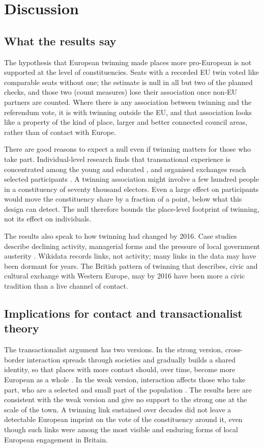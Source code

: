 \documentclass[11pt,a4paper]{article}
\begin{document}
\section{Discussion}\label{sec:disc}
\subsection{What the results say}
The hypothesis that European twinning made places more pro-European is not supported at the level of constituencies. Seats with a recorded EU twin voted like comparable seats without one; the estimate is null in all but two of the planned checks, and those two (count measures) lose their association once non-EU partners are counted. Where there is any association between twinning and the referendum vote, it is with twinning outside the EU, and that association looks like a property of the kind of place, larger and better connected council areas, rather than of contact with Europe.

There are good reasons to expect a null even if twinning matters for those who take part. Individual-level research finds that transnational experience is concentrated among the young and educated \citep{kuhn2015,fligstein2008}, and organised exchanges reach selected participants \citep{sigalas2010,mitchell2015}. A twinning association might involve a few hundred people in a constituency of seventy thousand electors. Even a large effect on participants would move the constituency share by a fraction of a point, below what this design can detect. The null therefore bounds the place-level footprint of twinning, not its effect on individuals.

The results also speak to how twinning had changed by 2016. Case studies describe declining activity, managerial forms and the pressure of local government austerity \citep{falkenhain2012,langenohl2023,warwick2024}. Wikidata records links, not activity; many links in the data may have been dormant for years. The British pattern of twinning that \citet{clarke2010} describes, civic and cultural exchange with Western Europe, may by 2016 have been more a civic tradition than a live channel of contact.


\subsection{Implications for contact and transactionalist theory}
The transactionalist argument has two versions. In the strong version, cross-border interaction spreads through societies and gradually builds a shared identity, so that places with more contact should, over time, become more European as a whole \citep{deutsch1957}. In the weak version, interaction affects those who take part, who are a selected and small part of the population \citep{fligstein2008,kuhn2011,kuhn2015}. The results here are consistent with the weak version and give no support to the strong one at the scale of the town. A twinning link sustained over decades did not leave a detectable European imprint on the vote of the constituency around it, even though such links were among the most visible and enduring forms of local European engagement in Britain.
\end{document}
